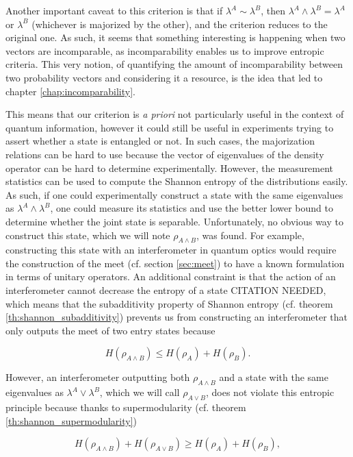 Another important caveat to this criterion is that if $\lambda^A \sim \lambda^B$, then $\lambda^A \wedge \lambda^B = \lambda^A$ or $\lambda^B$ (whichever is majorized by the other), and the criterion reduces to the original one. As such, it seems that something interesting is happening when two vectors are incomparable, as incomparability enables us to improve entropic criteria. This very notion, of quantifying the amount of incomparability between two probability vectors and considering it a resource, is the idea that led to chapter \ref{chap:incomparability}.


This means that our criterion is \textit{a priori} not particularly useful in the context of quantum information, however it could still be useful in experiments trying to assert whether a state is entangled or not. In such cases, the majorization relations can be hard to use because the vector of eigenvalues of the density operator can be hard to determine experimentally. However, the measurement statistics can be used to compute the Shannon entropy of the distributions easily. As such, if one could experimentally construct a state with the same eigenvalues as $\lambda^A \wedge \lambda^B$, one could measure its statistics and use the better lower bound to determine whether the joint state is separable. Unfortunately, no obvious way to construct this state, which we will note $\rho_{A \wedge B}$, was found. For example, constructing this state with an interferometer in quantum optics would require the construction of the meet (cf. section \ref{sec:meet}) to have a known formulation in terms of unitary operators. An additional constraint is that the action of an interferometer cannot decrease the entropy of a state CITATION NEEDED, which means that the subadditivity property of Shannon entropy (cf. theorem \ref{th:shannon_subadditivity}) prevents us from constructing an interferometer that only outputs the meet of two entry states because

\begin{equation}
    H(\rho_{A \wedge B}) \leq H(\rho_A) + H(\rho_B).
\end{equation}

However, an interferometer outputting both $\rho_{A \wedge B}$ and a state with the same eigenvalues as $\lambda^A \vee \lambda^B$, which we will call $\rho_{A \vee B}$, does not violate this entropic principle because thanks to supermodularity (cf. theorem \ref{th:shannon_supermodularity})

\begin{equation}
    H(\rho_{A \wedge B}) + H(\rho_{A \vee B}) \geq H(\rho_A) + H(\rho_B),
\end{equation}

